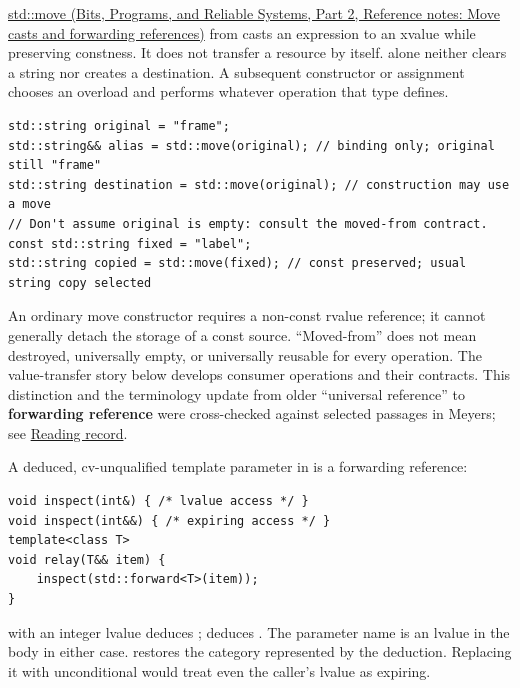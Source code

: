 \hypertarget{05-engine-i-ch003-move-permission-is-not-resource-transfer}{}

\href{../01-Bits-Programs-and-Reliable-Systems-P02/main.pdf\#nameddest=appendix-0104b704fb11}{std::move (Bits, Programs, and Reliable Systems, Part 2, Reference notes: Move casts and forwarding references)} from  casts an expression to an xvalue while preserving constness. It does not transfer a resource by itself.  alone neither clears a string nor creates a destination. A subsequent constructor or assignment chooses an overload and performs whatever operation that type defines.

\begin{verbatim}
std::string original = "frame";
std::string&& alias = std::move(original); // binding only; original still "frame"
std::string destination = std::move(original); // construction may use a move
// Don't assume original is empty: consult the moved-from contract.
const std::string fixed = "label";
std::string copied = std::move(fixed); // const preserved; usual string copy selected
\end{verbatim}

An ordinary  move constructor requires a non-const rvalue reference; it cannot generally detach the storage of a const source. ``Moved-from'' does not mean destroyed, universally empty, or universally reusable for every operation. The value-transfer story below develops consumer operations and their contracts. This distinction and the terminology update from older ``universal reference'' to \textbf{forwarding reference} were cross-checked against selected passages in Meyers; see \hyperref[appendix-a103e7846d21-m008---borrowing-categories-and-const-access]{Reading record}.

A deduced, cv-unqualified template parameter in  is a forwarding reference:

\begin{verbatim}
void inspect(int&) { /* lvalue access */ }
void inspect(int&&) { /* expiring access */ }
template<class T>
void relay(T&& item) {
    inspect(std::forward<T>(item));
}
\end{verbatim}

 with an integer lvalue deduces ;  deduces . The parameter name  is an lvalue in the body in either case.  restores the category represented by the deduction. Replacing it with unconditional  would treat even the caller's lvalue as expiring.

